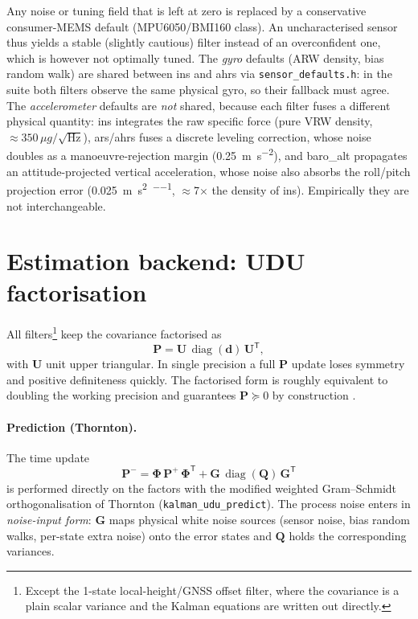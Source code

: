 \documentclass[11pt,a4paper]{article}
\newcommand{\vect}[1]{\bm{#1}}
\newcommand{\mat}[1]{\bm{#1}}
\newcommand{\T}{^{\mathsf{T}}}
\newcommand{\diag}{\operatorname{diag}}
\newcommand{\code}[1]{\texttt{#1}}
\begin{document}
Any noise or tuning field that is left at zero is replaced by a conservative
consumer-MEMS default (MPU6050/BMI160 class). An uncharacterised sensor thus
yields a stable (slightly cautious) filter instead of an overconfident one,
which is however not optimally tuned. The \emph{gyro} defaults (ARW density,
bias random walk) are shared between ins and ahrs via
\code{sensor\_\allowbreak{}defaults.h}: in the suite both filters observe the
same physical gyro, so their fallback must agree. The \emph{accelerometer}
defaults are \emph{not} shared, because each filter fuses a different physical
quantity: ins integrates the raw specific force (pure VRW density,
$\approx\!350\,\mu g/\sqrt{\text{Hz}}$), ars/ahrs fuses a discrete leveling
correction, whose noise doubles as a manoeuvre-rejection margin
(\SI{0.25}{\metre\per\second\squared}), and baro\_alt propagates an
attitude-projected vertical acceleration, whose noise also absorbs the
roll/pitch projection error
(\SI{0.025}{\metre\per\second\squared\per\sqrt{\hertz}},
$\approx$7$\times$ the density of ins). Empirically they are not
interchangeable.
\section{Estimation backend: UDU factorisation}
\label{sec:udu}

All filters\footnote{Except the 1-state local-height/GNSS offset filter, where
the covariance is a plain scalar variance and the Kalman equations are
written out directly.} keep the covariance factorised as
\begin{equation}
  \mat{P} = \mat{U}\,\diag(\vect{d})\,\mat{U}\T ,
\end{equation}
with $\mat{U}$ unit upper triangular. In single precision a full
$\mat{P}$ update loses symmetry and positive definiteness quickly. The
factorised form is roughly equivalent to doubling the working precision
and guarantees $\mat{P} \succeq 0$ by construction
\cite{bierman1977,grewal2015,carpenter2018}.

\paragraph{Prediction (Thornton).}
The time update
\begin{equation}
  \mat{P}^- = \mat{\Phi}\,\mat{P}^+\,\mat{\Phi}\T
            + \mat{G}\,\diag(\vect{Q})\,\mat{G}\T
  \label{eq:thornton}
\end{equation}
is performed directly on the factors with the modified weighted Gram--Schmidt
orthogonalisation of Thornton (\code{kalman\_\allowbreak{}udu\_\allowbreak{}predict}).
The process noise enters in \emph{noise-input form}: $\mat{G}$ maps physical
white noise sources (sensor noise, bias random walks, per-state extra noise)
onto the error states and $\vect{Q}$ holds the corresponding
variances.
\end{document}
